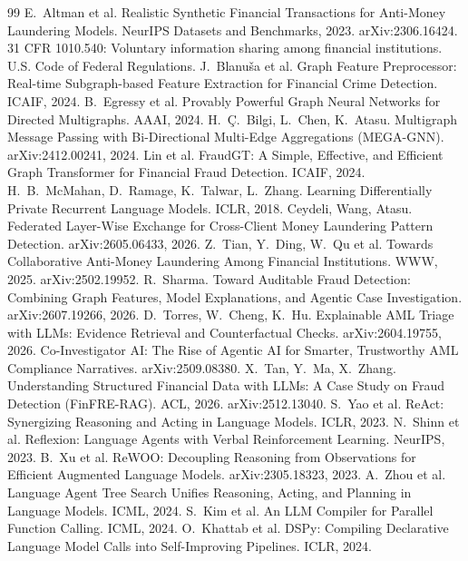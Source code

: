 \documentclass[11pt,a4paper]{article}
\begin{document}
\begin{thebibliography}{99}\small
{} E.~Altman et al. Realistic Synthetic Financial Transactions for Anti-Money Laundering Models. NeurIPS Datasets and Benchmarks, 2023. arXiv:2306.16424.
 31 CFR 1010.540: Voluntary information sharing among financial institutions. U.S. Code of Federal Regulations.
 J.~Blanu\v{s}a et al. Graph Feature Preprocessor: Real-time Subgraph-based Feature Extraction for Financial Crime Detection. ICAIF, 2024.
 B.~Egressy et al. Provably Powerful Graph Neural Networks for Directed Multigraphs. AAAI, 2024.
 H.~\c{C}.~Bilgi, L.~Chen, K.~Atasu. Multigraph Message Passing with Bi-Directional Multi-Edge Aggregations (MEGA-GNN). arXiv:2412.00241, 2024.
 Lin et al. FraudGT: A Simple, Effective, and Efficient Graph Transformer for Financial Fraud Detection. ICAIF, 2024.
 H.~B.~McMahan, D.~Ramage, K.~Talwar, L.~Zhang. Learning Differentially Private Recurrent Language Models. ICLR, 2018.
 Ceydeli, Wang, Atasu. Federated Layer-Wise Exchange for Cross-Client Money Laundering Pattern Detection. arXiv:2605.06433, 2026.
 Z.~Tian, Y.~Ding, W.~Qu et al. Towards Collaborative Anti-Money Laundering Among Financial Institutions. WWW, 2025. arXiv:2502.19952.
 R.~Sharma. Toward Auditable Fraud Detection: Combining Graph Features, Model Explanations, and Agentic Case Investigation. arXiv:2607.19266, 2026.
 D.~Torres, W.~Cheng, K.~Hu. Explainable AML Triage with LLMs: Evidence Retrieval and Counterfactual Checks. arXiv:2604.19755, 2026.
 Co-Investigator AI: The Rise of Agentic AI for Smarter, Trustworthy AML Compliance Narratives. arXiv:2509.08380.
 X.~Tan, Y.~Ma, X.~Zhang. Understanding Structured Financial Data with LLMs: A Case Study on Fraud Detection (FinFRE-RAG). ACL, 2026. arXiv:2512.13040.
 S.~Yao et al. ReAct: Synergizing Reasoning and Acting in Language Models. ICLR, 2023.
 N.~Shinn et al. Reflexion: Language Agents with Verbal Reinforcement Learning. NeurIPS, 2023.
 B.~Xu et al. ReWOO: Decoupling Reasoning from Observations for Efficient Augmented Language Models. arXiv:2305.18323, 2023.
 A.~Zhou et al. Language Agent Tree Search Unifies Reasoning, Acting, and Planning in Language Models. ICML, 2024.
 S.~Kim et al. An LLM Compiler for Parallel Function Calling. ICML, 2024.
 O.~Khattab et al. DSPy: Compiling Declarative Language Model Calls into Self-Improving Pipelines. ICLR, 2024.
\end{thebibliography}
\end{document}
